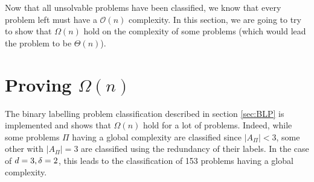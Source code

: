 Now that all unsolvable problems have been classified, we know that every problem left must have a $\mathcal{O}(n)$ complexity. In this section, we are going to try to show that  $\Omega(n)$ hold on the complexity of some problems (which would lead the problem to be $\Theta(n)$).
\section[Proving Omega(n)]{Proving $\Omega(n)$}
The binary labelling problem classification described in section \ref{sec:BLP} is implemented and shows that $\Omega(n)$ hold for a lot of problems. Indeed, while some problems $\Pi$ having a global complexity are classified since $|A_\Pi|<3$, some other with $|A_\Pi| = 3$ are classified using the redundancy of their labels. In the case of $d = 3, \delta = 2$, this leads to the classification of 153 problems having a global complexity.